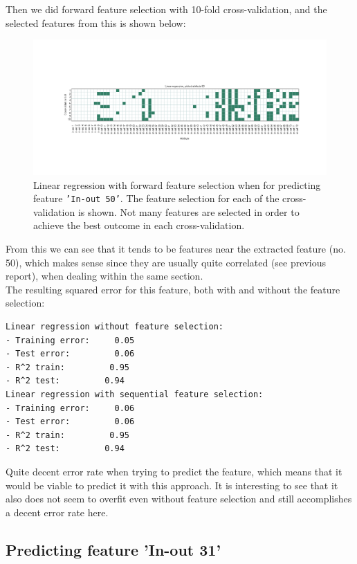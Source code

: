 Then we did forward feature selection with 10-fold cross-validation, and the selected features from this is shown below:

\begin{figure}[H]
\centering
\includegraphics[width=\linewidth, trim= 50mm 50mm 50mm 60mm, clip]{code/linear_regression_attr50}
\caption{Linear regression with forward feature selection when for predicting feature \texttt{'In-out 50'}. The feature selection for each of the cross-validation is shown. Not many features are selected in order to achieve the best outcome in each cross-validation.}
\label{fig:linforward_attr50}
\end{figure}

From this we can see that it tends to be features near the extracted feature (no. 50), which makes sense since they are usually quite correlated (see previous report), when dealing within the same section. \\

The resulting squared error for this feature, both with and without the feature selection:

\begin{verbatim}
Linear regression without feature selection:
- Training error:     0.05
- Test error:         0.06
- R^2 train:         0.95
- R^2 test:         0.94
Linear regression with sequential feature selection:
- Training error:     0.06
- Test error:         0.06
- R^2 train:         0.95
- R^2 test:         0.94
\end{verbatim}

Quite decent error rate when trying to predict the feature, which means that it would be viable to predict it with this approach. It is interesting to see that it also does not seem to overfit even without feature selection and still accomplishes a decent error rate here.

\subsection*{Predicting feature 'In-out 31'}

